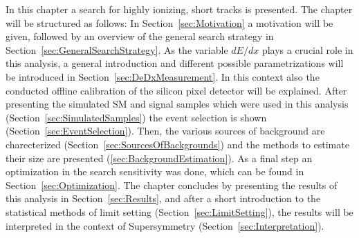 In this chapter a search for highly ionizing, short tracks is presented. The chapter will be structured as follows:
In \mbox{Section~\ref{sec:Motivation}} a motivation will be given, followed by an overview of the general search strategy in \mbox{Section~\ref{sec:GeneralSearchStrategy}}.
As the variable $dE/dx$ plays a crucial role in this analysis, a general introduction and different possible parametrizations will be introduced in \mbox{Section~\ref{sec:DeDxMeasurement}}.
In this context also the conducted offline calibration of the silicon pixel detector will be explained.
After presenting the simulated SM and signal samples which were used in this analysis (\mbox{Section~\ref{sec:SimulatedSamples}}) the event selection is shown (Section~\ref{sec:EventSelection}).
Then, the various sources of background are charecterized (Section~\ref{sec:SourcesOfBackgrounds}) and the methods to estimate their size are presented (\ref{sec:BackgroundEstimation}).
As a final step an optimization in the search sensitivity was done, which can be found in Section~\ref{sec:Optimization}.
The chapter concludes by presenting the results of this analysis in Section~\ref{sec:Results}, and after a short introduction to the statistical methods of limit setting (Section~\ref{sec:LimitSetting}), the results will be interpreted in the context of Supersymmetry (Section~\ref{sec:Interpretation}).


